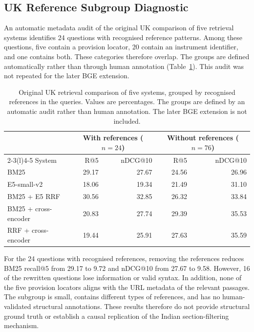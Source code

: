 \documentclass[pdflatex,sn-basic]{sn-jnl}%
\theoremstyle{thmstyleone}%
\theoremstyle{thmstyletwo}%
\theoremstyle{thmstylethree}%
\begin{document}
\FloatBarrier

\subsection{UK Reference Subgroup Diagnostic}
\label{app:uk_reference}

An automatic metadata audit of the original UK comparison of five retrieval
systems identifies 24 questions with recognised reference patterns. Among
these questions, five contain a provision locator, 20 contain an instrument
identifier, and one contains both. These categories therefore overlap. The
groups are defined automatically rather than through human annotation
(Table~\ref{tab:uk_reference_subgroups}). This audit was not repeated for the
later BGE extension.

\begin{table}[!htbp]
    \caption{Original UK retrieval comparison of five systems, grouped by
    recognised references in the queries. Values are percentages. The groups
    are defined by an automatic audit rather than human annotation. The later
    BGE extension is not included.}
    \label{tab:uk_reference_subgroups}
    \centering
    \scriptsize
    \setlength{\tabcolsep}{1.8pt}
    \begin{tabular}{@{}lrr@{\hspace{10pt}}rr@{}}
        \toprule
        & \multicolumn{2}{c}{With references ($n=24$)}
        & \multicolumn{2}{c}{Without references ($n=76$)} \\
        \cmidrule(lr){2-3}\cmidrule(l){4-5}
        System & R@5 & nDCG@10 & R@5 & nDCG@10 \\
        \midrule
        BM25                  & 29.17 & 27.67 & 24.56 & 26.96 \\
        E5-small-v2           & 18.06 & 19.34 & 21.49 & 31.10 \\
        BM25 + E5 RRF         & 30.56 & 32.85 & 26.32 & 33.84 \\
        BM25 + cross-encoder  & 20.83 & 27.74 & 29.39 & 35.53 \\
        RRF + cross-encoder   & 19.44 & 25.91 & 27.63 & 35.59 \\
        \bottomrule
    \end{tabular}
\end{table}

For the 24 questions with recognised references, removing the references
reduces BM25 recall@5 from 29.17 to 9.72 and nDCG@10 from 27.67 to 9.58.
However, 16 of the rewritten questions lose information or valid syntax. In
addition, none of the five provision locators aligns with the URL metadata of
the relevant passages. The subgroup is small, contains different types of
references, and has no human-validated structural annotations. These results
therefore do not provide structural ground truth or establish a causal
replication of the Indian section-filtering mechanism.
\end{document}
